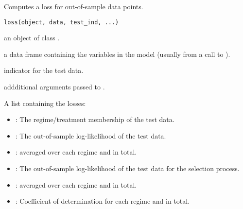 %
\begin{Description}
Computes a loss for out-of-sample data points.
\end{Description}
%
\begin{Usage}
\begin{verbatim}
loss(object, data, test_ind, ...)
\end{verbatim}
\end{Usage}
%
\begin{Arguments}
\begin{ldescription}
\item[\code{object}] an object of class .

\item[\code{data}] a data frame containing the variables in the model (usually from
a call to ).

\item[\code{test\_ind}] indicator for the test data.

\item[\code{...}] addditional arguments passed to .
\end{ldescription}
\end{Arguments}
%
\begin{Value}
A list containing the losses:
\begin{itemize}

\item{} : The regime/treatment membership of the test data.
\item{} : The out-of-sample log-likelihood of the test data.
\item{} :  averaged over each regime and in total.
\item{} : The out-of-sample log-likelihood of the test data for the selection
process.
\item{} :  averaged over each regime and in total.
\item{} : Coefficient of determination for each regime and in total.

\end{itemize}

\end{Value}


